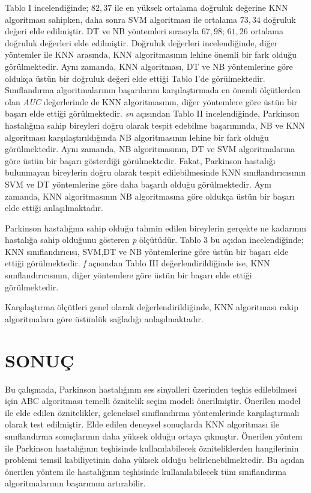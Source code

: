 \documentclass[conference]{IEEEtran}
\begin{document}
%
Tablo I incelendiğinde; $82,37$ ile en yüksek ortalama doğruluk değerine KNN algoritması sahipken, daha sonra SVM algoritması ile ortalama $73,34$ doğruluk değeri elde edilmiştir. DT ve NB yöntemleri sırasıyla $67,98$; $61,26$ ortalama doğruluk değerleri elde edilmiştir. Doğruluk değerleri incelendiğinde, diğer yöntemler ile KNN arasında, KNN algoritmasının lehine önemli bir fark olduğu görülmektedir. Aynı zamanda, KNN algoritması, DT ve NB yöntemlerine göre oldukça üstün bir doğruluk değeri elde ettiği Tablo I’de görülmektedir. Sınıflandırma algoritmalarının başarılarını karşılaştırmada en önemli ölçütlerden olan \textit{AUC}  değerlerinde de KNN algoritmasının, diğer yöntemlere göre üstün bir başarı elde ettiği görülmektedir.
\textit{sn}  açısından Tablo II incelendiğinde, Parkinson hastalığına sahip bireyleri doğru olarak tespit edebilme başarımında, NB ve  KNN algoritması karşılaştırıldığında NB algoritmasının lehine bir fark olduğu görülmektedir. Aynı zamanda, NB algoritmasının, DT ve SVM algoritmalarına göre üstün bir başarı gösterdiği görülmektedir. Fakat, Parkinson hastalığı bulunmayan bireylerin doğru olarak tespit edilebilmesinde KNN sınıflandırıcısının SVM ve DT yöntemlerine göre daha başarılı olduğu görülmektedir. Aynı zamanda, KNN algoritmasının NB algoritmasına göre oldukça üstün bir başarı elde ettiği anlaşılmaktadır.

Parkinson hastalığına sahip olduğu tahmin edilen bireylerin gerçekte ne kadarının hastalığa sahip olduğunu gösteren \textit{p} ölçütüdür. Tablo 3 bu açıdan incelendiğinde; KNN sınıflandırıcısı, SVM,DT ve NB yöntemlerine göre  üstün bir başarı elde ettiği görülmektedir. \textit{f} açısından Tablo III değerlendirildiğinde ise, KNN sınıflandırıcısının, diğer yöntemlere göre üstün bir başarı elde ettiği görülmektedir.

Karşılaştırma ölçütleri genel olarak değerlendirildiğinde, KNN algoritması rakip algoritmalara göre üstünlük sağladığı anlaşılmaktadır.

\section{SONUÇ}

Bu çalışmada, Parkinson hastalığının ses sinyalleri üzerinden teşhis edilebilmesi için ABC algoritması temelli öznitelik seçim modeli önerilmiştir. Önerilen model ile elde edilen öznitelikler, geleneksel sınıflandırma yöntemlerinde karşılaştırmalı olarak test edilmiştir. Elde edilen deneysel sonuçlarda KNN algoritması ile sınıflandırma sonuçlarının daha yüksek olduğu ortaya çıkmıştır. Önerilen yöntem ile Parkinson hastalığının teşhisinde kullanılabilecek özniteliklerden hangilerinin problemi temsil kabiliyetinin daha yüksek olduğu belirlenebilmektedir. Bu açıdan önerilen yöntem ile hastalığının teşhisinde kullanılabilecek tüm sınıflandırma algoritmalarının başarımını artırabilir.
\end{document}
